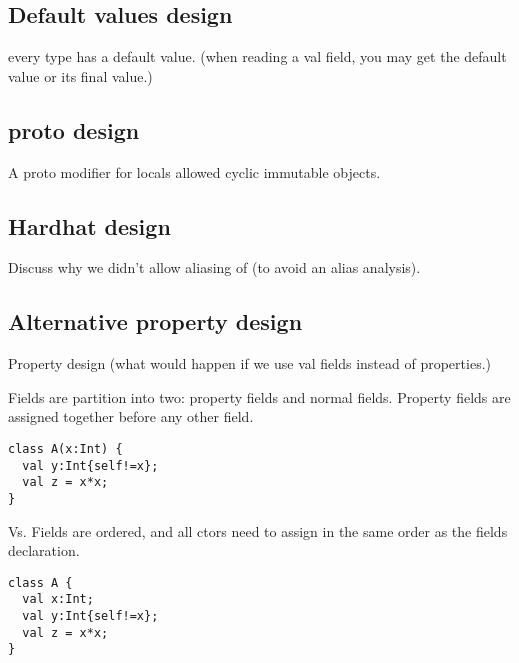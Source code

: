 

\subsection{Default values design}
every type has a default value.
(when reading a val field, you may get the default value or its final value.)

\subsection{proto design}
A proto modifier for locals
allowed cyclic immutable objects.

\subsection{Hardhat design}

Discuss why we didn't allow aliasing of \this (to avoid an alias analysis).



\subsection{Alternative property design}

Property design (what would happen if we use val fields instead of properties.)

Fields are partition into two: property fields and normal fields. Property fields are assigned together before any other field.
\begin{lstlisting}
class A(x:Int) {
  val y:Int{self!=x};
  val z = x*x;
}
\end{lstlisting}
Vs.
Fields are ordered, and all ctors need to assign in the same order as the fields declaration.
\begin{lstlisting}
class A {
  val x:Int;
  val y:Int{self!=x};
  val z = x*x;
}
\end{lstlisting}
